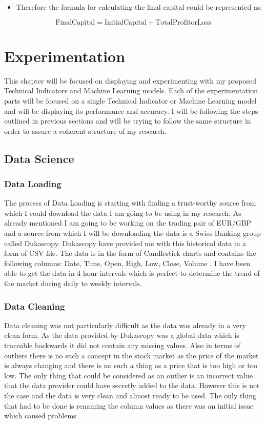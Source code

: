 \documentclass{imc-inf}
\begin{document}
	\begin{itemize}
		\item Therefore the formula for calculating the final capital could be represented as:
	\end{itemize}
	\begin{equation}
		\mathrm{Final Capital} = \mathrm{Initial Capital} + \mathrm{Total Profit or Loss}
	\end{equation}
	
	
	\chapter{Experimentation}
	This chapter will be focused on displaying and experimenting with my proposed Technical Indicators and Machine Learning models. Each of the experimentation 
	parts will be focused on a single Technical Indicator or Machine Learning model and will be displaying its performance and accuracy. I will be following the 
	steps outlined in previous sections and will be trying to follow the same structure in order to assure a coherent structure of my research. 
	
	\section{Data Science}
	\subsection{Data Loading}
	The process of Data Loading is starting with finding a trust-worthy source from which I could download the data I am going to be using in my 
	research. As already mentioned  I am going to be working on the trading pair of EUR/GBP and a source from which I will be downloading the data 
	is a Swiss Banking group called Dukascopy. Dukascopy have provided me with this historical data in a form of CSV file. The data is in the form of
	Candlestick charts and contains the following columns: Date, Time, Open, High, Low, Close, Volume \cite{Technical_Indicators_with_the_Volume}. I have been able to get the data in 4 hour intervals
	which is perfect to determine the trend of the market during daily to weekly intervals. 
	\subsection{Data Cleaning}
	Data cleaning was not particularly difficult as the data was already in a very clean form. As the data provided by Dukascopy was a global data which is 
	traceable backwards it did not contain any missing values. Also in terms of outliers there is no such a concept in the stock market as the price of the 
	market is always changing and there is no such a thing as a price that is too high or too low. The only thing that could be considered as an outlier is 
	an incorrect value that the data provider could have secretly added to the data. However this is not the case and the data is very clean and almost ready to be used.
	The only thing that had to be done is renaming the column values as there was an initial issue which caused problems
\end{document}

